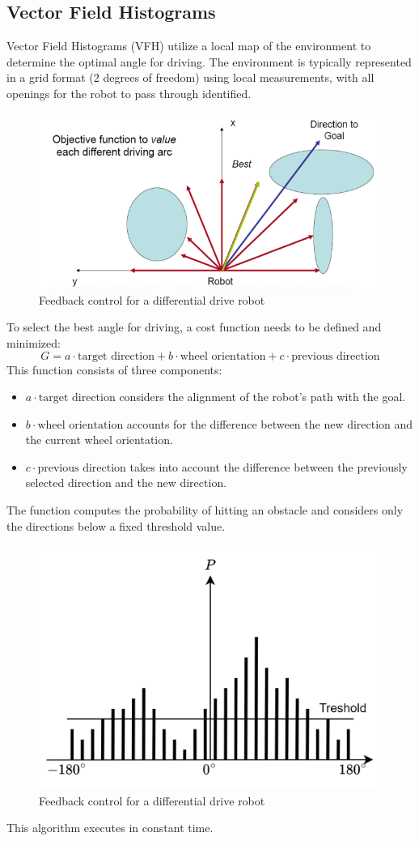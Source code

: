 \subsection{Vector Field Histograms}
Vector Field Histograms (VFH) utilize a local map of the environment to determine the optimal angle for driving. 
The environment is typically represented in a grid format (2 degrees of freedom) using local measurements, with all openings for the robot to pass through identified.
\begin{figure}[H]
    \centering
    \includegraphics[width=0.75\linewidth]{images/vfh.png}
    \caption{Feedback control for a differential drive robot}
\end{figure}
To select the best angle for driving, a cost function needs to be defined and minimized:
\[G=a\cdot\text{target direction}+b\cdot\text{wheel orientation}+c\cdot\text{previous direction}\]
This function consists of three components:
\begin{itemize}
    \item $a\cdot\text{target direction}$ considers the alignment of the robot's path with the goal.
    \item $b\cdot\text{wheel orientation}$ accounts for the difference between the new direction and the current wheel orientation.
    \item $c\cdot\text{previous direction}$ takes into account the difference between the previously selected direction and the new direction.
\end{itemize}
The function computes the probability of hitting an obstacle and considers only the directions below a fixed threshold value. 
\begin{figure}[H]
    \centering
    \includegraphics[width=0.75\linewidth]{images/fed1.png}
    \caption{Feedback control for a differential drive robot}
\end{figure}
This algorithm executes in constant time.

